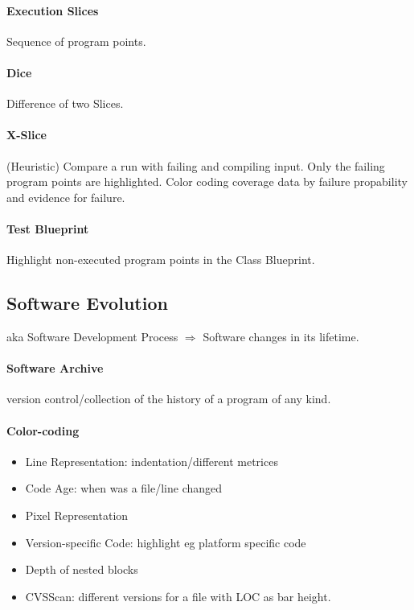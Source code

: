 \documentclass[ngerman]{scrartcl}
\begin{document}
\paragraph{Execution Slices} Sequence of program points.

\paragraph{Dice} Difference of two Slices.

\paragraph{X-Slice} (Heuristic) Compare a run with failing and compiling input. Only the failing program points are highlighted. Color coding coverage data by failure propability and evidence for failure.

\paragraph{Test Blueprint} Highlight non-executed program points in the Class Blueprint. 


\subsection{Software Evolution}
aka Software Development Process $ \Rightarrow $ Software changes in its lifetime.

\paragraph{Software Archive} version control/collection of the history of a program of any kind. 

\paragraph{Color-coding}
\begin{itemize}
  \item Line Representation: indentation/different metrices
  \item Code Age: when was a file/line changed
  \item Pixel Representation
  \item Version-specific Code: highlight eg platform specific code
  \item Depth of nested blocks
  \item CVSScan: different versions for a file with LOC as bar height.
\end{itemize}
\end{document}
